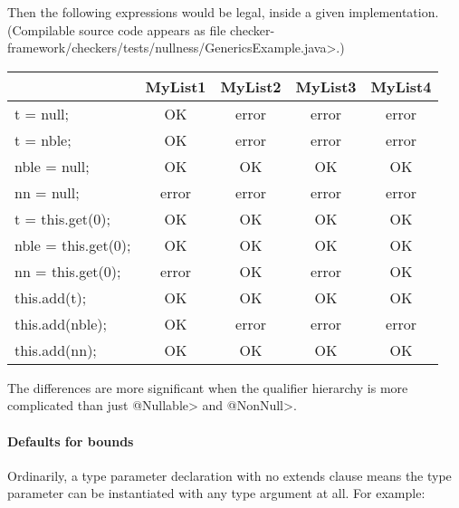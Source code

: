 \noindent
Then the following expressions would be legal, inside a given implementation.
(Compilable source code appears as file
\<checker-framework/checkers/tests/nullness/GenericsExample.java>.)

\begin{tabular}{|l|c|c|c|c|} \hline
                        & MyList1 & MyList2 & MyList3 & MyList4 \\ \hline
  t = null;             & OK      & error   & error   & error   \\ \hline
  t = nble;             & OK      & error   & error   & error   \\ \hline
  nble = null;          & OK      & OK      & OK      & OK      \\ \hline
  nn = null;            & error   & error   & error   & error   \\ \hline
  t = this.get(0);      & OK      & OK      & OK      & OK      \\ \hline
  nble = this.get(0);   & OK      & OK      & OK      & OK      \\ \hline
  nn = this.get(0);     & error   & OK      & error   & OK      \\ \hline
  this.add(t);          & OK      & OK      & OK      & OK      \\ \hline
  this.add(nble);       & OK      & error   & error   & error   \\ \hline
  this.add(nn);         & OK      & OK      & OK      & OK      \\ \hline
\end{tabular}


\medskip

The differences are more
significant when the qualifier hierarchy is more complicated than just
\<@Nullable> and \<@NonNull>.


\paragraph{Defaults for bounds}
Ordinarily, a type parameter declaration with no extends clause means the
type parameter can be instantiated with any type argument at all.  For
example:

